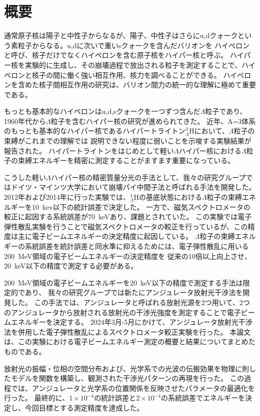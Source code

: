 \documentclass[a4paper,11pt,uplatex]{jsbook}
\begin{document}
\chapter*{概要}
通常原子核は陽子と中性子からなるが、陽子、中性子はさらにu,dクォークという素粒子からなる。u,dに次いで重いsクォークを含んだバリオンを
ハイペロンと呼び、核子だけでなくハイペロンを含む原子核をハイパー核と呼ぶ。
ハイパー核を実験的に生成し、その崩壊過程で放出される粒子を測定することで、ハイペロンと核子の間に働く強い相互作用、核力を調べることができる。
ハイペロンを含めた核子間相互作用の研究は、バリオン間力の統一的な理解に極めて重要である。

もっとも基本的なハイペロンはu,d,sクォークを一つずつ含んだ$\Lambda$粒子であり、1960年代から$\Lambda$粒子を含むハイパー核の研究が進められてきた。
近年、A=3体系のもっとも基本的なハイパー核であるハイパートライトン$_{\Lambda}^3\text{H}$において、$\Lambda$粒子の束縛がこれまでの理解では
説明できない程度に弱いことを示唆する実験結果が報告された。
ハイパートライトンをはじめとして軽い$\Lambda$ハイパー核における$\Lambda$粒子の束縛エネルギーを精密に測定することがますます重要になっている。

こうした軽い$\Lambda$ハイパー核の精密質量分光の手法として、我々の研究グループではドイツ・マインツ大学において崩壊パイ中間子法と呼ばれる手法を開発した。
2012年および2014年に行った実験では、$_{\Lambda}^4\text{H}$の基底状態における$\Lambda$粒子の束縛エネルギーを10~kev以下の統計誤差で決定した。
一方で、磁気スペクトロメータの較正に起因する系統誤差が70~keVあり、課題とされていた。
この実験では電子弾性散乱実験を行うことで磁気スペクトロメータの較正を行っているが、この精度は主に電子ビームエネルギーの決定精度に起因している。
$\Lambda$粒子の束縛エネルギーの系統誤差を統計誤差と同水準に抑えるためには、電子弾性散乱に用いる200~MeV領域の電子ビームエネルギーの決定精度を
従来の10倍以上向上させ、$20$~keV以下の精度で測定する必要がある。

200~MeV領域の電子ビームエネルギーを$20$~keV以下の精度で測定する手法は限定的であり、
我々の研究グループでは新たにアンジュレータ放射光干渉法を開発した。
この手法では、アンジュレータと呼ばれる放射光源を2つ用いて、2つのアンジュレータから放射される放射光の干渉光強度を測定することで電子ビームエネルギーを決定する。
2024年3月-5月にかけて、アンジュレータ放射光干渉法を併用した電子弾性散乱によるスペクトロメータ較正実験を行った。
本論文は、この実験における電子ビームエネルギー測定の概要と結果についてまとめたものである。

放射光の振幅・位相の空間分布および、光学系での光波の伝搬効果を物理に則したモデルを関数を構築し、観測された干渉光パターンの再現を行った。
この過程では、アンジュレータと光学系の位置関係を反映させたパラメータの最適化を行った。
最終的に、$1\times10^{-4}$の統計誤差と$2\times10^{-4}$の系統誤差でエネルギーを決定し、今回目標とする測定精度を達成した。
\end{document}
